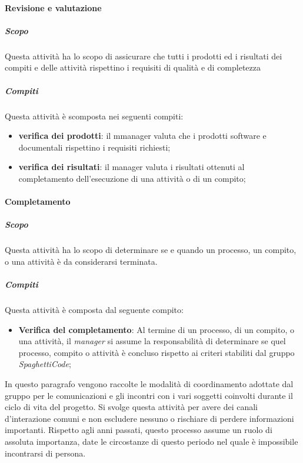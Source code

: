 \paragraph{Revisione e valutazione}
\label{par:revisione_e_valutazione}
\subparagraph{Scopo}
\label{par:revisione_e_valutazione:scopo}
Questa attività ha lo scopo di assicurare che tutti i prodotti ed i risultati dei compiti e delle attività rispettino i requisiti di qualità e di completezza\\
\subparagraph{Compiti}
\label{par:revisione_e_valutazione:Compiti}
Questa attività è scomposta nei seguenti compiti:
\begin{itemize}
    \item \textbf{verifica dei prodotti}: il mmanager valuta che i prodotti software e documentali rispettino i requisiti richiesti;
    \item \textbf{verifica dei risultati}: il manager valuta i risultati ottenuti al completamento dell'esecuzione di una attività o di un compito;
\end{itemize}

\paragraph{Completamento}
\label{par:completamento}
\subparagraph{Scopo}
\label{par:completamento:scopo}
Questa attività ha lo scopo di determinare se e quando un processo, un compito, o una attività è da considerarsi terminata.\\
\subparagraph{Compiti}
\label{par:completamento:compiti}
Questa attività è composta dal seguente compito:
\begin{itemize}
	\item \textbf{Verifica del completamento}: Al termine di un processo, di un compito, o una attività, il \emph{manager} si assume la responsabilità di determinare se quel processo, compito o attività è concluso rispetto ai criteri stabiliti dal gruppo \emph{SpaghettiCode};
\end{itemize}


In questo paragrafo vengono raccolte le modalità di coordinamento adottate dal gruppo per le comunicazioni e gli
incontri con i vari soggetti coinvolti durante il ciclo di vita del progetto. Si svolge questa attività per avere
dei canali d'interazione comuni e non escludere nessuno o rischiare di perdere informazioni importanti. Rispetto
agli anni passati, questo processo assume un ruolo di assoluta importanza, date le circostanze di questo periodo
nel quale è impossibile incontrarsi di persona.


